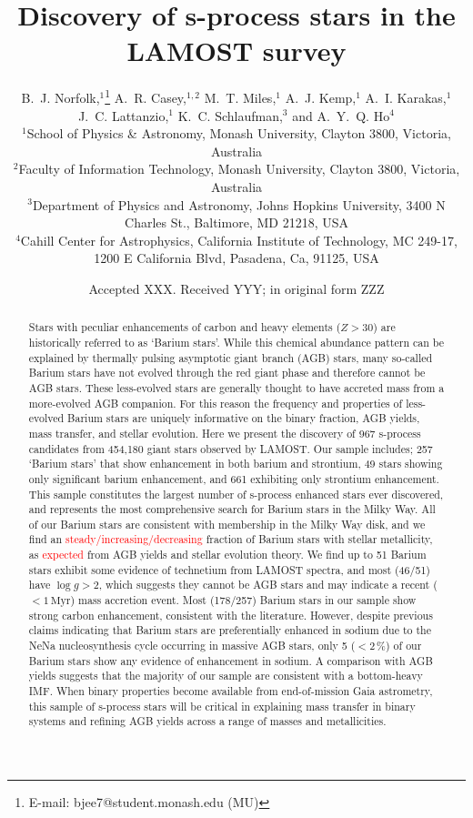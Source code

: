 \documentclass[a4paper,fleqn,usenatbib]{mnras}
\title[S-process stars in LAMOST]{Discovery of s-process stars in the LAMOST survey}
\author[B.~J. Norfolk et al.]{B.~J. Norfolk,$^{1}$\thanks{E-mail: bjee7@student.monash.edu (MU)}
A.~R. Casey,$^{1,2}$
M.~T. Miles,$^{1}$
A.~J. Kemp,$^{1}$ 
A.~I. Karakas,$^{1}$ \newauthor
J.~C. Lattanzio,$^{1}$
K.~C. Schlaufman,$^{3}$
and A.~Y.~Q. Ho$^{4}$
\\
$^{1}$School of Physics \& Astronomy, Monash University, Clayton 3800, Victoria, Australia\\
$^{2}$Faculty of Information Technology, Monash University, Clayton 3800, Victoria, Australia\\
$^{3}$Department of Physics and Astronomy, Johns Hopkins University, 3400 N Charles St., Baltimore, MD 21218, USA\\
$^{4}$Cahill Center for Astrophysics, California Institute of Technology, MC 249-17, 1200 E California Blvd, Pasadena, Ca, 91125, USA
}
\date{Accepted XXX. Received YYY; in original form ZZZ}
\newcommand{\todo}[1]{\textcolor{red}{#1}}
\begin{document}
\label{firstpage}
\pagerange{\pageref{firstpage}--\pageref{lastpage}}
\maketitle

\begin{abstract}
Stars with peculiar enhancements of carbon and heavy elements ($Z > 30$) are historically referred to as `Barium stars'. While this chemical abundance pattern can be explained by thermally pulsing asymptotic giant branch (AGB) stars, many so-called Barium stars have not evolved through the red giant phase and therefore cannot be AGB stars. These less-evolved stars are generally thought to have accreted mass from a more-evolved AGB companion. For this reason the frequency and properties of less-evolved Barium stars are uniquely informative on the binary fraction, AGB yields, mass transfer, and stellar evolution. Here we present the discovery of 967 s-process candidates from 454,180 giant stars observed by LAMOST. Our sample includes; 257 `Barium stars' that show enhancement in both barium and strontium, 49 stars showing only significant barium enhancement, and 661 exhibiting only strontium enhancement. This sample constitutes the largest number of s-process enhanced stars ever discovered, and represents the most comprehensive search for Barium stars in the Milky Way. All of our Barium stars are consistent with membership in the Milky Way disk, and we find an \todo{steady/increasing/decreasing} fraction of Barium stars with stellar metallicity, as \todo{expected} from AGB yields and stellar evolution theory. We find up to 51 Barium stars exhibit some evidence of technetium from LAMOST spectra, and most (46/51) have $\log{g}>2$, which suggests they cannot be AGB stars and may indicate a recent ($<1\,\textrm{Myr}$) mass accretion event. Most (178/257) Barium stars in our sample show strong carbon enhancement, consistent with the literature. However, despite previous claims indicating that Barium stars are preferentially enhanced in sodium due to the NeNa nucleosynthesis cycle occurring in massive AGB stars, only 5 ($<2$\,\%) of our Barium stars show any evidence of enhancement in sodium. A comparison with AGB yields suggests that the majority of our sample are consistent with a bottom-heavy IMF.
When binary properties become available from end-of-mission Gaia astrometry, this sample of s-process stars will be critical in explaining mass transfer in binary systems and refining AGB yields across a range of masses and metallicities.
\end{abstract}
\end{document}
